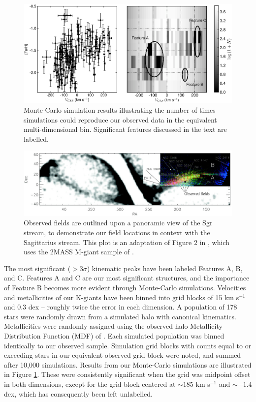 \documentclass[preprint2]{aastex}
\begin{document}
	\begin{figure}[h!]
		\includegraphics[width=\columnwidth]{./monte_carlo.eps}
		\caption{Monte-Carlo simulation results illustrating the number of times simulations could reproduce our observed data in the equivalent multi-dimensional bin. Significant features discussed in the text are labelled.}
		\label{fig:monte-carlo}
	\end{figure}

	\begin{figure}[t!]
		\includegraphics[width=\textwidth]{./adapted_belokurov_2006.eps}
		\caption{Observed fields are outlined upon a panoramic view of the Sgr stream, to demonstrate our field locations in context with the Sagittarius stream. This plot is an adaptation of Figure 2 in \citet{Belokurov;et-al_2006}, which uses the 2MASS M-giant sample of \citet{Majewski;et-al_2003}.}
		\label{fig:sgr-field-of-streams}
	\end{figure}
	
	The most significant ($>3\sigma$) kinematic peaks have been labeled Features A, B, and C. Features A and C are our most significant structures, and the importance of Feature B becomes more evident through Monte-Carlo simulations. Velocities and metallicities of our K-giants have been binned into grid blocks of 15 km s$^{-1}$ and 0.3 dex \--- roughly twice the error in each dimension. A population of 178 stars were randomly drawn from a simulated halo with canonical kinematics. Metallicities were randomly assigned using the observed halo Metallicity Distribution Function (MDF) of \citet{Ryan;Norris_1991}. Each simulated population was binned identically to our observed sample. Simulation grid blocks with counts equal to or exceeding stars in our equivalent observed grid block were noted, and summed after 10,000 simulations. Results from our Monte-Carlo simulations are illustrated in Figure \ref{fig:monte-carlo}. These were consistently significant when the grid was midpoint offset in both dimensions, except for the grid-block centered at $\sim185$ km s$^{-1}$ and $\sim-1.4$ dex, which has consequently been left unlabelled.
	
\end{document}
